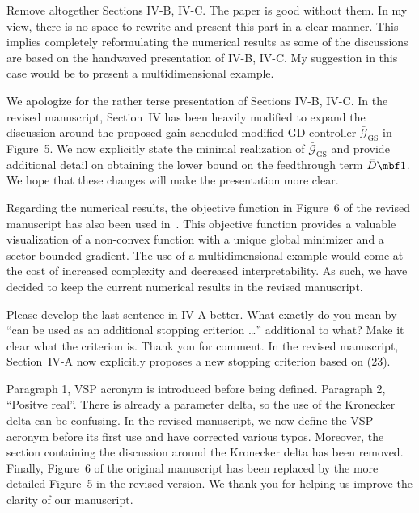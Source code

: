 \begin{rebuttal}[pending]
    {%
        Remove altogether Sections IV-B, IV-C. The paper is good without them. In my view, there is no space to rewrite and present this part in a clear manner. This implies completely reformulating the numerical results as some of the discussions are based on the handwaved presentation of IV-B, IV-C. My suggestion in this case would be to present a multidimensional example. 
    }%
    {%
        We apologize for the rather terse presentation of Sections IV-B, IV-C. In the revised manuscript, Section~IV has been heavily modified to expand the discussion around the proposed gain-scheduled modified GD controller \(\bar{\bm{\mathcal{G}}}_{\textrm{GS}}\) in Figure~5. We now explicitly state the minimal realization of \(\bar{\bm{\mathcal{G}}}_{\textrm{GS}}\) and provide additional detail on obtaining the lower bound on the feedthrough term \(\bar{D}\eye\). We hope that these changes will make the presentation more clear.

        Regarding the numerical results, the objective function in Figure~6 of the revised manuscript has also been used in~\cite{ugrinovskii,alex_petersen}. This objective function provides a valuable visualization of a non-convex function with a unique global minimizer and a sector-bounded gradient. The use of a multidimensional example would come at the cost of increased complexity and decreased interpretability. As such, we have decided to keep the current numerical results in the revised manuscript.
    }%
\end{rebuttal}
\begin{rebuttal}[resolved]
    {%
        Please develop the last sentence in IV-A better. What exactly do you mean by ``can be used as an additional stopping criterion \dots'' additional to what? Make it clear what the criterion is. 
    }%
    {%
        Thank you for comment. In the revised manuscript, Section~IV-A now explicitly proposes a new stopping criterion based on (23).
    }%
\end{rebuttal}
\begin{rebuttal}[resolved]
    {%
        Paragraph 1, VSP acronym is introduced before being defined. Paragraph 2, ``Positve real''. There is already a parameter delta, so the use of the Kronecker delta can be confusing.
    }%
    {%
        In the revised manuscript, we now define the VSP acronym before its first use and have corrected various typos. Moreover, the section containing the discussion around the Kronecker delta has been removed. Finally, Figure~6 of the original manuscript has been replaced by the more detailed Figure~5 in the revised version. We thank you for helping us improve the clarity of our manuscript.
    }%
\end{rebuttal}
